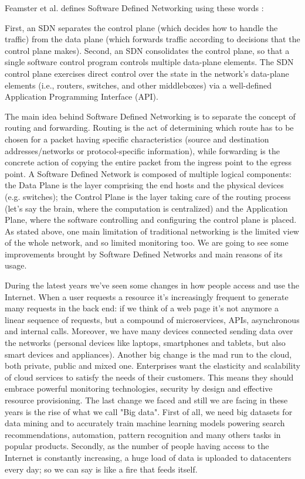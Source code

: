 Feamster et al. defines Software Defined Networking using these words \cite{sdn-definition}:
\begin{quoting}[font=itshape, begintext={"}, endtext={"}]
First, an SDN separates the control plane (which decides how to handle the traffic) from the data plane (which forwards traffic according to decisions that the control plane makes). Second, an SDN consolidates the control plane, so that a single software control program controls multiple data-plane elements. The SDN control plane exercises direct control over the state in the network’s data-plane elements (i.e., routers, switches, and other middleboxes) via a well-defined Application Programming Interface (API).
\end{quoting}

The main idea behind Software Defined Networking is to separate the concept of routing and forwarding. Routing is the act of determining which route has to be chosen for a packet having specific characteristics (source and destination addresses/networks or protocol-specific information), while forwarding is the concrete action of copying the entire packet from the ingress point to the egress point. A Software Defined Network is composed of multiple logical components: the Data Plane is the layer comprising the end hosts and the physical devices (e.g. switches); the Control Plane is the layer taking care of the routing process (let's say the brain, where the computation is centralized) and the Application Plane, where the software controlling and configuring the control plane is placed. As stated above, one main limitation of traditional networking is the limited view of the whole network, and so limited monitoring too. We are going to see some improvements brought by Software Defined Networks and main reasons of its usage.

During the latest years we've seen some changes in how people access and use the Internet. When a user requests a resource it's increasingly frequent to generate many requests in the back end: if we think of a web page it's not anymore a linear sequence of requests, but a compound of microservices, APIs, asynchronous and internal calls. Moreover, we have many devices connected sending data over the networks (personal devices like laptops, smartphones and tablets, but also smart devices and appliances). Another big change is the mad run to the cloud, both private, public and mixed one. Enterprises want the elasticity and scalability of cloud services to satisfy the needs of their customers. This means they should embrace powerful monitoring technologies, security by design and effective resource provisioning. The last change we faced and still we are facing in these years is the rise of what we call "Big data". First of all, we need big datasets for data mining and to accurately train machine learning models powering search recommendations, automation, pattern recognition and many others tasks in popular products. Secondly, as the number of people having access to the Internet is constantly increasing, a huge load of data is uploaded to datacenters every day; so we can say is like a fire that feeds itself.

